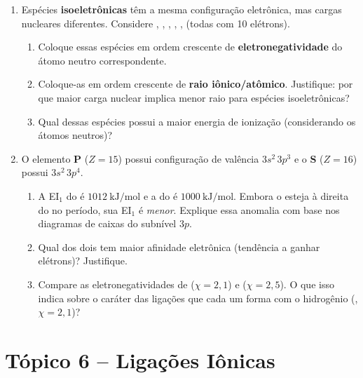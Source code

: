 \documentclass[10pt,a4paper]{article}
\begin{document}
\begin{enumerate}[resume]
\item Espécies \textbf{isoeletrônicas} têm a mesma configuração
  eletrônica, mas cargas nucleares diferentes.
  Considere , , , ,
  ,  (todas com 10 elétrons).
  \begin{enumerate}
    \item Coloque essas espécies em ordem crescente de
          \textbf{eletronegatividade} do átomo neutro
          correspondente.
    \item Coloque-as em ordem crescente de \textbf{raio iônico/atômico}.
          Justifique: por que maior carga nuclear implica
          menor raio para espécies isoeletrônicas?
    \item Qual dessas espécies possui a maior energia de
          ionização (considerando os átomos neutros)?
  \end{enumerate}

\item O elemento \textbf{P} ($Z=15$) possui configuração de
  valência $3s^2\,3p^3$ e o \textbf{S} ($Z=16$) possui
  $3s^2\,3p^4$.
  \begin{enumerate}
    \item A EI$_1$ do  é $1012~\text{kJ/mol}$ e a do
           é $1000~\text{kJ/mol}$. Embora o  esteja
          à direita do  no período, sua EI$_1$ é
          \emph{menor}. Explique essa anomalia com base nos
          diagramas de caixas do subnível $3p$.
    \item Qual dos dois tem maior afinidade eletrônica
          (tendência a ganhar elétrons)? Justifique.
    \item Compare as eletronegatividades de 
          ($\chi = 2{,}1$) e  ($\chi = 2{,}5$).
          O que isso indica sobre o caráter das ligações
          que cada um forma com o hidrogênio (,
          $\chi = 2{,}1$)?
  \end{enumerate}

\end{enumerate}

\newpage
\section*{Tópico 6 \; -- \; Ligações Iônicas}
\end{document}
